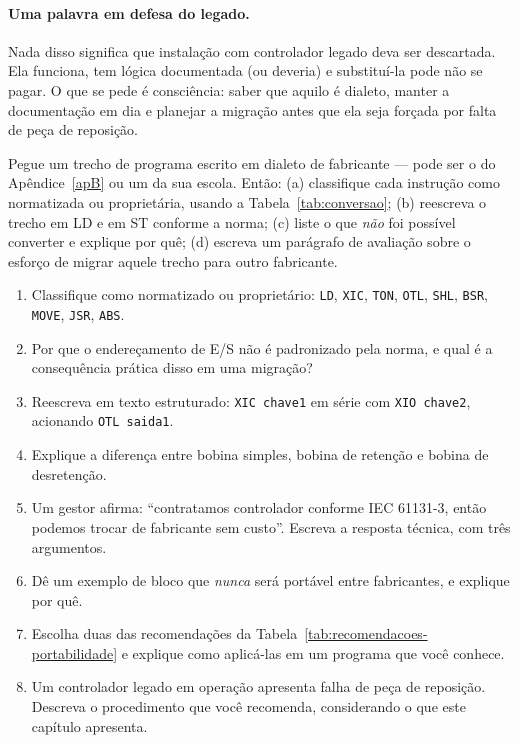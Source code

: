 \paragraph{Uma palavra em defesa do legado.} Nada disso significa que instalação com controlador
legado deva ser descartada. Ela funciona, tem lógica documentada (ou deveria) e substituí-la pode não
se pagar. O que se pede é consciência: saber que aquilo é dialeto, manter a documentação em dia e
planejar a migração antes que ela seja forçada por falta de peça de reposição.

\begin{pratica}
Pegue um trecho de programa escrito em dialeto de fabricante --- pode ser o do Apêndice~\ref{apB} ou
um da sua escola. Então:
(a) classifique cada instrução como normatizada ou proprietária, usando a
Tabela~\ref{tab:conversao};
(b) reescreva o trecho em LD e em ST conforme a norma;
(c) liste o que \emph{não} foi possível converter e explique por quê;
(d) escreva um parágrafo de avaliação sobre o esforço de migrar aquele trecho para outro fabricante.
\end{pratica}

\begin{exercicios}
\begin{enumerate}[label=\alph*)]
  \item Classifique como normatizado ou proprietário: \texttt{LD}, \texttt{XIC}, \texttt{TON},
        \texttt{OTL}, \texttt{SHL}, \texttt{BSR}, \texttt{MOVE}, \texttt{JSR}, \texttt{ABS}.
  \item Por que o endereçamento de E/S não é padronizado pela norma, e qual é a consequência prática
        disso em uma migração?
  \item Reescreva em texto estruturado: \texttt{XIC chave1} em série com \texttt{XIO chave2},
        acionando \texttt{OTL saida1}.
  \item Explique a diferença entre bobina simples, bobina de retenção e bobina de desretenção.
  \item Um gestor afirma: ``contratamos controlador conforme IEC 61131-3, então podemos trocar de
        fabricante sem custo''. Escreva a resposta técnica, com três argumentos.
  \item Dê um exemplo de bloco que \emph{nunca} será portável entre fabricantes, e explique por quê.
  \item Escolha duas das recomendações da Tabela~\ref{tab:recomendacoes-portabilidade} e explique
        como aplicá-las em um programa que você conhece.
  \item Um controlador legado em operação apresenta falha de peça de reposição. Descreva o
        procedimento que você recomenda, considerando o que este capítulo apresenta.
\end{enumerate}
\end{exercicios}
